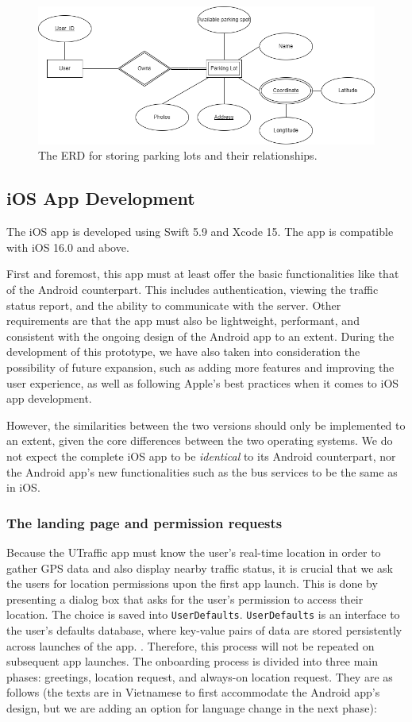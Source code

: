 \begin{figure}[H]
    \centering
    \includegraphics[width=0.8\linewidth]{assets/images/Implementation/Parking/Parking ERD.drawio.png}
    \caption{The ERD for storing parking lots and their relationships.}
    \label{fig:parking_erd}
\end{figure}

\subsection{iOS App Development}
The iOS app is developed using Swift 5.9 and Xcode 15. The app is compatible with iOS 16.0 and above.

First and foremost, this app must at least offer the basic functionalities like that of the Android counterpart. This includes authentication, viewing the traffic status report, and the ability to communicate with the server. Other requirements are that the app must also be lightweight, performant, and consistent with the ongoing design of the Android app to an extent. During the development of this prototype, we have also taken into consideration the possibility of future expansion, such as adding more features and improving the user experience, as well as following Apple's best practices when it comes to iOS app development.

However, the similarities between the two versions should only be implemented to an extent, given the core differences between the two operating systems. We do not expect the complete iOS app to be \textit{identical} to its Android counterpart, nor the Android app's new functionalities such as the bus services to be the same as in iOS. 


\subsubsection{The landing page and permission requests}
Because the UTraffic app must know the user's real-time location in order to gather GPS data and also display nearby traffic status, it is crucial that we ask the users for location permissions upon the first app launch. This is done by presenting a dialog box that asks for the user's permission to access their location. The choice is saved into \lstinline{UserDefaults}. \lstinline{UserDefaults} is an interface to the user's defaults database, where key-value pairs of data are stored persistently across launches of the app. \cite{a2019_userdefaults}. Therefore, this process will not be repeated on subsequent app launches. The onboarding process is divided into three main phases: greetings, location request, and always-on location request. They are as follows (the texts are in Vietnamese to first accommodate the Android app's design, but we are adding an option for language change in the next phase):

